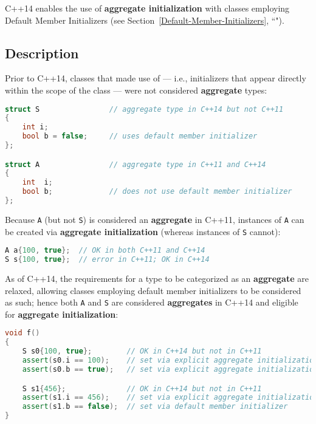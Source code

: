 
C++14 enables the use of \textbf{aggregate initialization} with classes
employing Default Member Initializers (see Section~\ref{Default-Member-Initializers}, ``").

\subsection[Description]{Description}\label{description}

Prior to C++14, classes that made use of  --- i.e., initializers that appear directly within the
scope of the class --- were not considered \textbf{aggregate} types:

\begin{lstlisting}[language=C++]
struct S                // aggregate type in C++14 but not C++11
{
    int i;
    bool b = false;     // uses default member initializer
};

struct A                // aggregate type in C++11 and C++14
{
    int  i;
    bool b;             // does not use default member initializer
};
\end{lstlisting}

\noindent Because \texttt{A} (but not \texttt{S}) is considered an \textbf{aggregate} in
C++11, instances of \texttt{A} can be created via \textbf{aggregate
initialization} (whereas instances of \texttt{S} cannot):

\begin{lstlisting}[language=C++]
A a{100, true};  // OK in both C++11 and C++14
S s{100, true};  // error in C++11; OK in C++14
\end{lstlisting}


\noindent As of C++14, the requirements for a type to be categorized as an
\textbf{aggregate} are relaxed, allowing classes employing default
member initializers to be considered as such; hence both \texttt{A} and
\texttt{S} are considered \textbf{aggregates} in C++14 and eligible for
\textbf{aggregate initialization}:

\begin{lstlisting}[language=C++]
void f()
{
    S s0{100, true};        // OK in C++14 but not in C++11
    assert(s0.i == 100);    // set via explicit aggregate initialization (above)
    assert(s0.b == true);   // set via explicit aggregate initialization (above)

    S s1{456};              // OK in C++14 but not in C++11
    assert(s1.i == 456);    // set via explicit aggregate initialization (above)
    assert(s1.b == false);  // set via default member initializer
}
\end{lstlisting}

